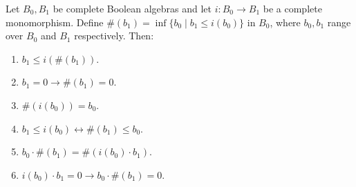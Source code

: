 Let $B_0, B_1$ be complete Boolean algebras and let $i: B_0 \rightarrow B_1$ be a complete monomorphism. Define $\#(b_1) = \inf \{b_0 \mid b_1 \leq i(b_0)\}$ in $B_0$, where $b_0, b_1$ range over $B_0$ and $B_1$ respectively. Then:

\begin{enumerate}
\item $b_1 \leq i(\#(b_1))$.
\item $b_1 = 0 \rightarrow \#(b_1) = 0$.
\item $\#(i(b_0)) = b_0$.
\item $b_1 \leq i(b_0) \leftrightarrow \#(b_1) \leq b_0$.
\item $b_0 \cdot \#(b_1) = \#(i(b_0) \cdot b_1)$.
\item $i(b_0) \cdot b_1 = 0 \rightarrow b_0 \cdot \#(b_1) = 0$.
\end{enumerate}
